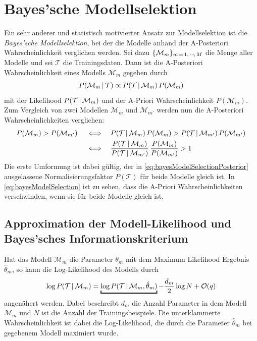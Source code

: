 	\section{Bayes'sche Modellselektion}
		Ein sehr anderer und statistisch motivierter Ansatz zur Modellselektion ist die \emph{Bayes'sche Modellselektion}, bei der die Modelle anhand der A-Posteriori Wahrscheinlichkeit verglichen werden. Sei dazu \( \{ \mathcal{M}_m \}_{m \,=\, 1,\,\cdots\!,\,M} \) die Menge aller Modelle und sei \(\mathcal{T}\) die Trainingsdaten. Dann ist die A-Posteriori Wahrscheinlichkeit eines Modells \( \mathcal{M}_m \) gegeben durch
		\begin{equation}
			P(\mathcal{M}_m \,\vert\, \mathcal{T}) \propto P(\mathcal{T} \,\vert\, \mathcal{M}_m) \, P(\mathcal{M}_m)  \label{eq:bayesModelSelectionPosterior}
		\end{equation}
		mit der Likelihood \( P(\mathcal{T} \,\vert\, \mathcal{M}_m) \) und der A-Priori Wahrscheinlichkeit \( P(\mathcal{M}_m) \). Zum Vergleich von zwei Modellen \( \mathcal{M}_m \) und \( \mathcal{M}_{m'} \) werden nun die A-Posteriori Wahrscheinlichkeiten verglichen:
		\begin{align}
			P(\mathcal{M}_m) > P(\mathcal{M}_{m'})
			\quad\iff&\quad  P(\mathcal{T} \,\vert\, \mathcal{M}_m) \, P(\mathcal{M}_m) > P(\mathcal{T} \,\vert\, \mathcal{M}_{m'}) \, P(\mathcal{M}_{m'}) \\
			\quad\iff&\quad  \frac{P(\mathcal{T} \,\vert\, \mathcal{M}_m)}{P(\mathcal{T} \,\vert\, \mathcal{M}_{m'})} \, \frac{P(\mathcal{M}_m)}{P(\mathcal{M}_{m'})} > 1  \label{eq:bayesModelSelection}
		\end{align}
		Die erste Umformung ist dabei gültig, der in \eqref{eq:bayesModelSelectionPosterior} ausgelassene Normalisierungsfaktor \( P(\mathcal{T}) \) für beide Modelle gleich ist. In \eqref{eq:bayesModelSelection} ist zu sehen, dass die A-Priori Wahrscheinlichkeiten verschwinden, wenn sie für beide Modelle gleich ist.

		\subsection{Approximation der Modell-Likelihood und Bayes'sches Informationskriterium}
			Hat das Modell \( \mathcal{M}_m \) die Parameter \( \theta_m \) mit dem Maximum Likelihood Ergebnis \( \hat{\theta}_m \), so kann die Log-Likelihood des Modells durch
			\begin{equation}
				\log P(\mathcal{T} \given \mathcal{M}_m) = \underbracket{\log P(\mathcal{T} \given \mathcal{M}_m, \hat{\theta}_m)} - \frac{d_m}{2} \log N + \mathcal{O}(q)  \label{eq:bayesModelSeletcionApproxLikelihood}
			\end{equation}
			angenähert werden. Dabei beschreibt \( d_m \) die Anzahl Parameter in dem Modell \(\mathcal{M}_m\) und \(N\) ist die Anzahl der Trainingsbeispiele. Die unterklammerte Wahrscheinlichkeit ist dabei die Log-Likelihood, die durch die Parameter \(\hat{\theta}_m\) bei gegebenem Modell maximiert wurde.

